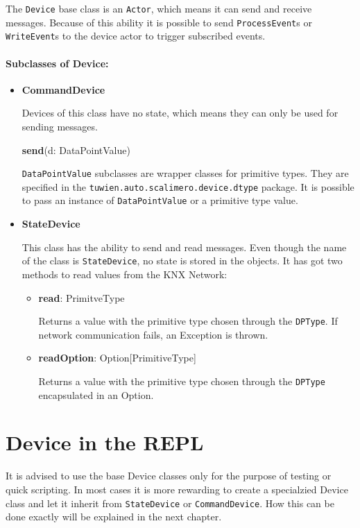 The \lstinline!Device! base class is an \lstinline!Actor!, which means it can send and receive messages. Because of this ability it is possible to send \lstinline!ProcessEvent!s or \lstinline!WriteEvent!s to the device actor to trigger subscribed events.

\paragraph{Subclasses of Device:}
\begin{itemize}
  \item \textbf{CommandDevice}

  Devices of this class have no state, which means they can only be used for sending messages.

    \textbf{send}(d: DataPointValue)

        \lstinline!DataPointValue! subclasses are wrapper classes for primitive types. They are specified in the \lstinline!tuwien.auto.scalimero.device.dtype! package. It is possible to pass an instance of \lstinline!DataPointValue! or a primitive type value.
  \item \textbf{StateDevice}

  This class has the ability to send and read messages. Even though the name of the class is \lstinline!StateDevice!, no state is stored in the objects. It has got two methods to read values from the KNX Network:
    \begin{itemize}
        \item \textbf{read}: PrimitveType

            Returns a value with the primitive type chosen through the \lstinline!DPType!. If network communication fails, an Exception is thrown.
        \item \textbf{readOption}: Option[PrimitiveType]

            Returns a value with the primitive type chosen through the \lstinline!DPType! encapsulated in an Option.
    \end{itemize}
\end{itemize}

\section{Device in the REPL}
It is advised to use the base Device classes only for the purpose of testing or quick scripting. In most cases it is more rewarding to create a specialzied Device class and let it inherit from \lstinline!StateDevice! or \lstinline!CommandDevice!. How this can be done exactly will be explained in the next chapter.

